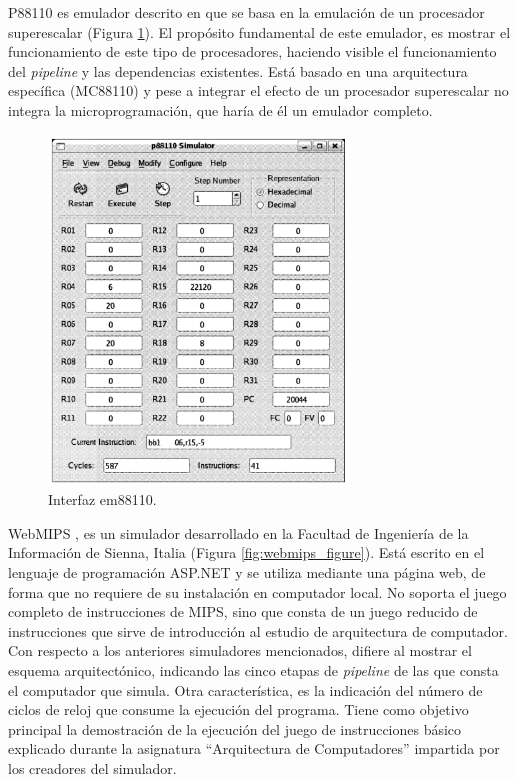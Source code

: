 P88110 es emulador descrito en \cite{garcia2009p88110} que se basa en la emulación de un procesador superescalar (Figura \ref{fig:p88110_figure}). El propósito fundamental de este emulador, es mostrar el funcionamiento de este tipo de procesadores, haciendo visible el funcionamiento del \emph{pipeline} y las dependencias existentes. Está basado en una arquitectura específica (MC88110) y pese a integrar el efecto de un procesador superescalar no integra la microprogramación, que haría de él un emulador completo.

\begin{figure}[htbp]
 	\centering
 	\includegraphics[width=8cm]{figures/em88110}
 	\caption{Interfaz em88110.}
	\label{fig:p88110_figure}
\end{figure}


WebMIPS \cite{branovic2004webmips}, es un simulador desarrollado en la Facultad de Ingeniería de la Información de Sienna, Italia (Figura \ref{fig:webmips_figure}). Está escrito en el lenguaje de programación ASP.NET y se utiliza mediante una página web, de forma que no requiere de su instalación en computador local. No soporta el juego completo de instrucciones de MIPS, sino que consta de un juego reducido de instrucciones que sirve de introducción al estudio de arquitectura de computador. Con respecto a los anteriores simuladores mencionados, difiere al mostrar el esquema arquitectónico, indicando las cinco etapas de \emph{pipeline} de las que consta el computador que simula. Otra característica, es la indicación del número de ciclos de reloj que consume la ejecución del programa. Tiene como objetivo principal la demostración de la ejecución del juego de instrucciones básico explicado durante la asignatura ``Arquitectura de Computadores'' impartida por los creadores del simulador.

